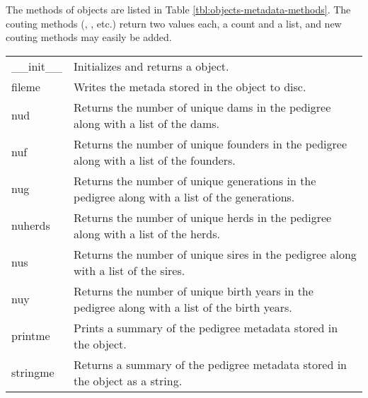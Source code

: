 The methods of  objects are listed in Table \ref{tbl:objects-metadata-methods}. The couting methods (, , etc.) return two values each, a count and a list, and new couting methods may easily be added.
\begin{center}
    \tablelasttail{\hline}
    \label{tbl:objects-metadata-methods}
    \begin{xtabular}{l|p{4in}}
        \_\_init\_\_ & Initializes and returns a  object. \\
        fileme & Writes the metada stored in the  object to disc. \\
        nud & Returns the number of unique dams in the pedigree along with a list of the dams. \\
        nuf & Returns the number of unique founders in the pedigree along with a list of the founders. \\
        nug & Returns the number of unique generations in the pedigree along with a list of the generations. \\
        nuherds & Returns the number of unique herds in the pedigree along with a list of the herds. \\
        nus & Returns the number of unique sires in the pedigree along with a list of the sires. \\
        nuy & Returns the number of unique birth years in the pedigree along with a list of the birth years. \\
        printme & Prints a summary of the pedigree metadata stored in the  object. \\
        stringme & Returns a summary of the pedigree metadata stored in the  object as a string. \\
    \end{xtabular}
\end{center}
